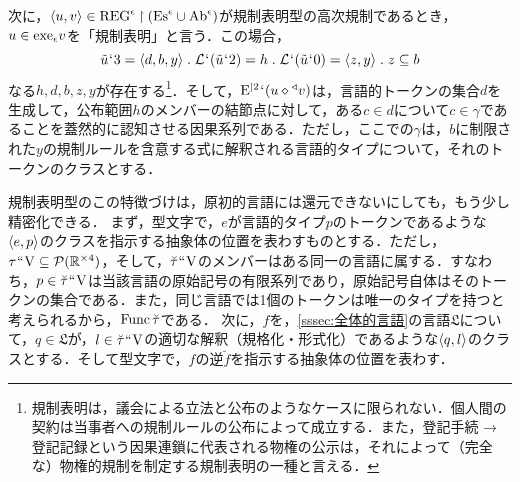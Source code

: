次に，$ \langle u,v \rangle\in\mathrm{REG}^\epsilon\mathbin{\upharpoonright}(\mathrm{Es}^\epsilon\cup\mathrm{Ab}^\epsilon) $が規制表明型の高次規制であるとき，$ u\in\mathrm{exe}_{\epsilon} v $を「規制表明」と言う．この場合，
\[
    \tilde{u}\fap 3 = \orp{d,b,y}\con{1}\mathcal{L}\fap(\tilde{u}\fap 2) = h\con{1}
    \mathcal{L}\fap(\tilde{u}\fap 0)=\orp{z,y}\con{1}z\subseteq b
\]
なる$ h,d,b,z,y $が存在する\footnote{
    規制表明は，議会による立法と公布のようなケースに限られない．個人間の契約は当事者への規制ルールの公布によって成立する．また，登記手続 → 登記記録という因果連鎖に代表される物権の公示は，それによって（完全な）物権的規制を制定する規制表明の一種と言える．
}．そして，$ \mathrm{E}^{\mid 2}{\mspace{1mu}{`}\mspace{1mu}}(u\diamond{^\triangleleft}v) $は，言語的トークンの集合$d$を生成して，公布範囲$h$のメンバーの結節点に対して，ある$c\in d$について$c \in \gamma$であることを蓋然的に認知させる因果系列である．ただし，ここでの$\gamma$は，$b$に制限された$y$の規制ルールを含意する式に解釈される言語的タイプについて，それのトークンのクラスとする．

規制表明型のこの特徴づけは，原初的言語には還元できないにしても，もう少し精密化できる．
まず，型文字\kagi{$ \tau $}で，$e$が言語的タイプ$p$のトークンであるような$ \langle e,p \rangle $のクラスを指示する抽象体の位置を表わすものとする．ただし，$ \tau{\mspace{1mu}{``}\mspace{1mu}}\mathrm{V}\subseteq \mathcal{P}(\mathbb{R}^{\times 4}) $，そして，$ \breve{\tau}{\mspace{1mu}{``}\mspace{1mu}}\mathrm{V} $のメンバーはある同一の言語に属する．すなわち，$ p\in \breve{\tau}{\mspace{1mu}{``}\mspace{1mu}}\mathrm{V} $は当該言語の原始記号の有限系列であり，原始記号自体はそのトークンの集合である．また，同じ言語では1個のトークンは唯一のタイプを持つと考えられるから，$ \operatorname{Func}\breve{\tau} $である．
次に，$ f $を，\ref{sssec:全体的言語}の言語$\mathfrak{L}$について，$q\in\mathfrak{L}$が，$ l\in\breve{\tau}{\mspace{1mu}{``}\mspace{1mu}}\mathrm{V} $の適切な解釈（規格化・形式化）であるような$\langle q,l \rangle$のクラスとする．そして型文字\kagi{$ \theta $}で，$ f $の逆$\breve{f}$を指示する抽象体の位置を表わす．

